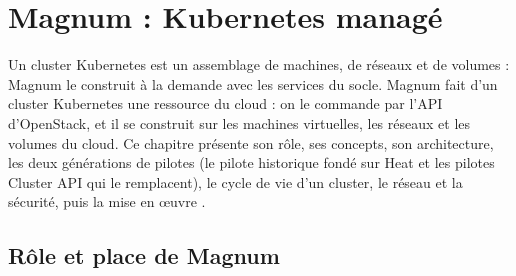 
\section{Magnum : Kubernetes managé}\label{chap:magnum}

Un cluster Kubernetes est un assemblage de machines, de réseaux et de volumes : Magnum le construit à la demande avec les
services du socle. Magnum fait d'un cluster Kubernetes une ressource du cloud : on le commande par l'API d'OpenStack, et il se
construit sur les machines virtuelles, les réseaux et les volumes du cloud. Ce chapitre présente son rôle, ses concepts, son
architecture, les deux générations de pilotes (le pilote historique fondé sur Heat et les pilotes Cluster API qui le
remplacent), le cycle de vie d'un cluster, le réseau et la sécurité, puis la mise en œuvre \parencite{magnum-index}.

\subsection{Rôle et place de Magnum}\label{sec:ma-role}

